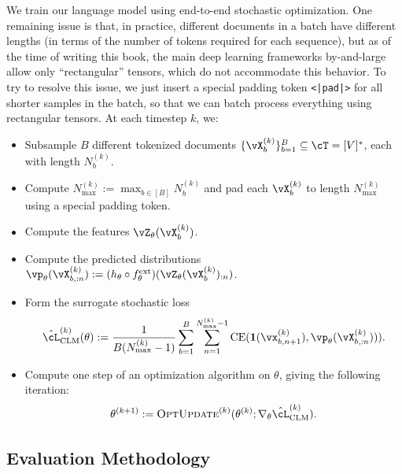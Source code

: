 \documentclass[../../book-main.tex]{subfiles}
\begin{document}
We train our language model using end-to-end stochastic optimization. One remaining issue is that, in practice, different documents in a batch have different lengths (in terms of the number of tokens required for each sequence), but as of the time of writing this book, the main deep learning frameworks by-and-large allow only ``rectangular'' tensors, which do not accommodate this behavior. To try to resolve this issue, we just insert a special padding token \texttt{<|pad|>} for all shorter samples in the batch, so that we can batch process everything using rectangular tensors. At each timestep \(k\), we:
\begin{itemize}
    \item Subsample \(B\) different tokenized documents \(\{\vX_{b}^{(k)}\}_{b = 1}^{B} \subseteq \cT = [V]^{*}\), each with length \(N_{b}^{(k)}\).
    \item Compute \(N_{\max}^{(k)} := \max_{b \in [B]}N_{b}^{(k)}\) and pad each \(\vX_{b}^{(k)}\) to length \(N_{\max}^{(k)}\) using a special padding token.
    \item Compute the features \(\vZ_{\theta}(\vX_{b}^{(k)})\).
    \item Compute the predicted distributions \(\vp_{\theta}(\vX_{b, :n}^{(k)}) := (h_{\theta} \circ f_{\theta}^{\ext})(\vZ_{\theta}(\vX_{b}^{(k)})_{:n})\).
    \item Form the surrogate stochastic loss 
    \begin{equation}
        \hat{\cL}_{\mathrm{CLM}}^{(k)}(\theta) := \frac{1}{B(N_{\max}^{(k)} - 1)}\sum_{b = 1}^{B}\sum_{n = 1}^{N_{\max}^{(k)}-1}\CE(\vone(\vx_{b, n + 1}^{(k)}), \vp_{\theta}(\vX_{b, :n}^{(k)}))).
    \end{equation}
    \item Compute one step of an optimization algorithm on \(\theta\), giving the following iteration:
    \begin{equation}
        \theta^{(k + 1)} := \textsc{OptUpdate}^{(k)}(\theta^{(k)}; \nabla_{\theta}\hat{\cL}_{\mathrm{CLM}}^{(k)}).
    \end{equation}
\end{itemize}

\subsection{Evaluation Methodology} \label{sub:clm_text_evals}
\end{document}
